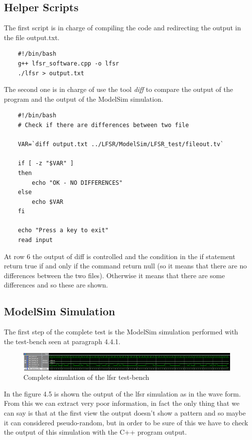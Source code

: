 \documentclass[a4paper]{report}
\begin{document}
\subsection{Helper Scripts}
The first script is in charge of compiling the code and redirecting the output in the file output.txt.
\lstset{ %
	language=sh }
\begin{lstlisting}	
	#!/bin/bash
	g++ lfsr_software.cpp -o lfsr
	./lfsr > output.txt
\end{lstlisting}

\noindent The second one is in charge of use the tool \emph{diff} to compare the output of the program and the output of the ModelSim simulation.
\begin{lstlisting}	
	#!/bin/bash
	# Check if there are differences between two file
	
	VAR=`diff output.txt ../LFSR/ModelSim/LFSR_test/fileout.tv`
	
	if [ -z "$VAR" ]
	then
		echo "OK - NO DIFFERENCES"
	else
		echo $VAR
	fi
	
	echo "Press a key to exit"
	read input
\end{lstlisting}

\noindent At row 6 the output of diff is controlled and the condition in the if statement return true if and only if the command return null (so it means that there are no differences between the two files). Otherwise it means that there are some differences and so these are shown.

\subsection{ModelSim Simulation}
The first step of the complete test is the ModelSim simulation performed with the test-bench seen at paragraph 4.4.1.
\begin{figure}[htpb]
	\centering
	\includegraphics[width=.64\textheight, height=.09\textheight]{img/tb/wave_lfsr_test.png}
	\caption{Complete simulation of the lfsr test-bench}
\end{figure}

\noindent In the figure 4.5 is shown the output of the lfsr simulation as in the wave form. From this we can extract very poor information, in fact the only thing that we can say is that at the first view the output doesn't show a pattern and so maybe it can considered pseudo-random, but in order to be sure of this we have to check the output of this simulation with the C++ program output.
\end{document}
